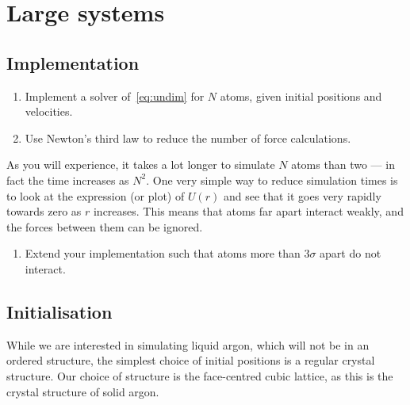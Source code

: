 \documentclass[11pt,british,a4paper]{report}
\begin{document}
\section{Large systems}

\subsection{Implementation}
\begin{enumerate}[label=\roman*.]
    \item Implement a solver of~\vref{eq:undim} for \(N\) atoms, given initial positions and velocities.
    \item Use Newton's third law to reduce the number of force calculations.
\end{enumerate}
As you will experience, it takes a lot longer to simulate \(N\) atoms than two --- in fact the time increases as \(N^2\). One very simple way to reduce simulation times is to look at the expression (or plot) of \(U(r)\) and see that it goes very rapidly towards zero as \(r\) increases. This means that atoms far apart interact weakly, and the forces between them can be ignored.

\begin{enumerate}[label=\roman*., resume]
    \item Extend your implementation such that atoms more than \(3\sigma\) apart do not interact.
\end{enumerate}

\subsection{Initialisation}
While we are interested in simulating liquid argon, which will not be in an ordered structure, the simplest choice of initial positions is a regular crystal structure. Our choice of structure is the face-centred cubic lattice, as this is the crystal structure of solid argon.
\end{document}
